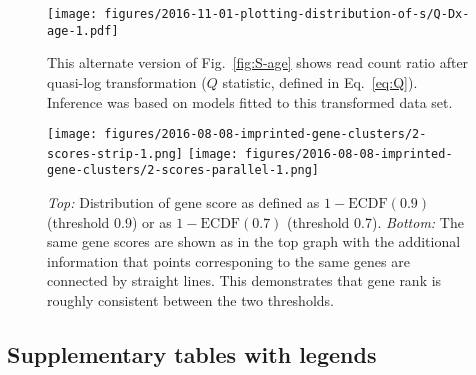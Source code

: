 \documentclass[letterpaper]{article}
\begin{document}
\begin{figure}[H]
\begin{center}
\texttt{[image: figures/2016-11-01-plotting-distribution-of-s/Q-Dx-age-1.pdf]}
\end{center}
\caption{
This alternate version of Fig.~\ref{fig:S-age} shows read count ratio after
quasi-log transformation (\(Q\) statistic, defined in Eq.~\ref{eq:Q}).
Inference was based on models fitted to this transformed data set.
}
\label{fig:Q-age}
\end{figure}

\begin{figure}[H]
\begin{center}
\texttt{[image: figures/2016-08-08-imprinted-gene-clusters/2-scores-strip-1.png]}
\texttt{[image: figures/2016-08-08-imprinted-gene-clusters/2-scores-parallel-1.png]}
\end{center}
\caption{
\emph{Top:} Distribution of gene score as defined as \(1 - \mathrm{ECDF}(0.9)\) (threshold
0.9) or as \(1 - \mathrm{ECDF}(0.7)\) (threshold 0.7).
\emph{Bottom:} The same gene scores are shown as in the top graph with the
additional information that points corresponing to the same genes are
connected by straight lines. This demonstrates that gene rank is roughly consistent between the two
thresholds.
}
\label{fig:2-scores}
\end{figure}

\clearpage

\subsection{Supplementary tables with legends}

\setcounter{table}{0}
\makeatletter 
\renewcommand{\thetable}{S\@arabic\c@table}
\makeatother
\end{document}

